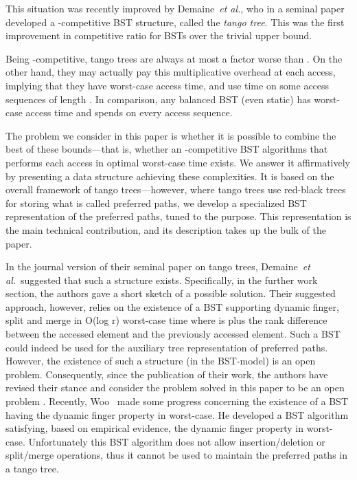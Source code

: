 \documentclass[letterpaper,11pt]{article}
\begin{document}
This situation was recently improved by Demaine~\emph{et al.}, who in a
seminal paper~\cite{tango} developed a -competitive BST
structure, called the \emph{tango tree}. This was the first improvement
in competitive ratio for BSTs over the trivial  upper
bound.


Being -competitive, tango trees are always at most a factor
 worse than .
On the other hand, they may actually pay this multiplicative overhead at
each access, implying that they have 
worst-case access time, and use  time on some
access sequences of length . In comparison, any balanced BST (even
static) has  worst-case access time and spends  on
every access sequence.

The problem we consider in this paper is whether it is possible to combine the
best of these bounds---that is, whether an -competitive BST
algorithms that performs each access in optimal  worst-case time
exists. We answer it affirmatively by presenting a data structure achieving
these complexities. It is based on the overall framework of tango
trees---however, where tango trees use red-black trees~\cite{redblack} for
storing what is
called preferred paths, we develop a specialized BST representation of the
preferred paths, tuned to the purpose. This representation is the main
technical contribution, and its description takes up the bulk of the paper.  

In the journal version of their seminal paper on tango trees,
Demaine~\emph{et al.}\ suggested that such a structure
exists. Specifically, in the further work section, the authors gave a short
sketch of a possible solution. Their suggested approach, however, relies on
the existence of a BST supporting dynamic finger, split and merge in O(log
r) worst-case time where  is  plus the rank difference between the
accessed element and the previously accessed element. Such a BST could
indeed be used for the auxiliary tree representation of preferred paths.
However, the existence of such a structure (in the BST-model) is an open
problem.  Consequently, since the publication of their work, the authors
have revised their stance and consider the problem solved in this paper to
be an open problem \cite{john}.  Recently, Woo~\cite{woo} made some
progress concerning the existence of a BST having the dynamic finger
property in worst-case. He developed a BST algorithm satisfying, based on
empirical evidence, the dynamic finger property in worst-case.
Unfortunately this BST algorithm does not allow insertion/deletion or
split/merge operations, thus it cannot be used to maintain the preferred
paths in a tango tree.
\end{document}
